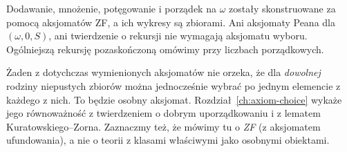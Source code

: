 \begin{uwaga}
\label{rem:zf-arithmetic-scope}
Dodawanie, mnożenie, potęgowanie
i porządek na $\omega$ zostały skonstruowane
za pomocą aksjomatów ZF, a ich wykresy
są zbiorami. Ani aksjomaty Peana dla
$(\omega,0,S)$, ani twierdzenie o rekursji
nie wymagają aksjomatu wyboru.
Ogólniejszą rekursję pozaskończoną
omówimy przy liczbach porządkowych.
\end{uwaga}

\begin{uwaga}
Żaden z dotychczas wymienionych aksjomatów nie orzeka,
że dla \emph{dowolnej} rodziny niepustych zbiorów można
jednocześnie wybrać po jednym elemencie z każdego z nich.
To będzie osobny aksjomat. Rozdział~\ref{ch:axiom-choice}
wykaże jego równoważność z twierdzeniem o dobrym uporządkowaniu
i z lematem Kuratowskiego--Zorna. Zaznaczmy też, że
mówimy tu o \emph{ZF} (z aksjomatem ufundowania), a nie
o teorii z klasami właściwymi jako osobnymi obiektami.
\end{uwaga}